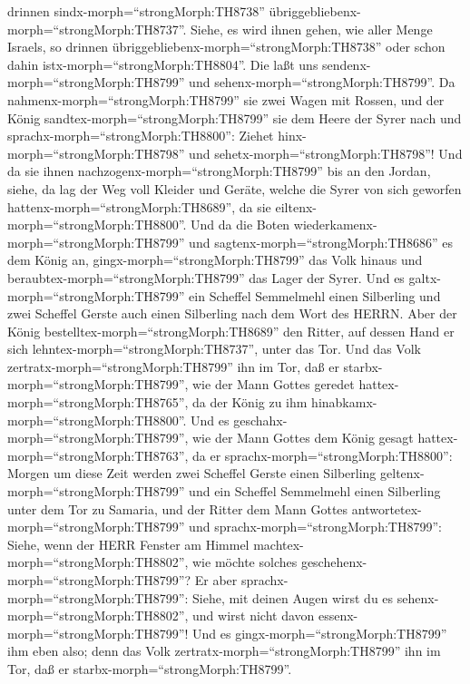 drinnen sindx-morph=``strongMorph:TH8738''
übriggebliebenx-morph=``strongMorph:TH8737''. Siehe, es wird ihnen
gehen, wie aller Menge Israels, so drinnen
übriggebliebenx-morph=``strongMorph:TH8738'' oder schon dahin
istx-morph=``strongMorph:TH8804''. Die laßt uns
sendenx-morph=``strongMorph:TH8799'' und
sehenx-morph=``strongMorph:TH8799''.  Da
nahmenx-morph=``strongMorph:TH8799'' sie zwei Wagen mit Rossen, und der
König sandtex-morph=``strongMorph:TH8799'' sie dem Heere der Syrer nach
und sprachx-morph=``strongMorph:TH8800'': Ziehet
hinx-morph=``strongMorph:TH8798'' und
sehetx-morph=``strongMorph:TH8798''!  Und da sie ihnen
nachzogenx-morph=``strongMorph:TH8799'' bis an den Jordan, siehe, da lag
der Weg voll Kleider und Geräte, welche die Syrer von sich geworfen
hattenx-morph=``strongMorph:TH8689'', da sie
eiltenx-morph=``strongMorph:TH8800''. Und da die Boten
wiederkamenx-morph=``strongMorph:TH8799'' und
sagtenx-morph=``strongMorph:TH8686'' es dem König an, 
gingx-morph=``strongMorph:TH8799'' das Volk hinaus und
beraubtex-morph=``strongMorph:TH8799'' das Lager der Syrer. Und es
galtx-morph=``strongMorph:TH8799'' ein Scheffel Semmelmehl einen
Silberling und zwei Scheffel Gerste auch einen Silberling nach dem Wort
des HERRN.  Aber der König
bestelltex-morph=``strongMorph:TH8689'' den Ritter, auf dessen Hand er
sich lehntex-morph=``strongMorph:TH8737'', unter das Tor. Und das Volk
zertratx-morph=``strongMorph:TH8799'' ihn im Tor, daß er
starbx-morph=``strongMorph:TH8799'', wie der Mann Gottes geredet
hattex-morph=``strongMorph:TH8765'', da der König zu ihm
hinabkamx-morph=``strongMorph:TH8800''.  Und es
geschahx-morph=``strongMorph:TH8799'', wie der Mann Gottes dem König
gesagt hattex-morph=``strongMorph:TH8763'', da er
sprachx-morph=``strongMorph:TH8800'': Morgen um diese Zeit werden zwei
Scheffel Gerste einen Silberling geltenx-morph=``strongMorph:TH8799''
und ein Scheffel Semmelmehl einen Silberling unter dem Tor zu Samaria,
 und der Ritter dem Mann Gottes
antwortetex-morph=``strongMorph:TH8799'' und
sprachx-morph=``strongMorph:TH8799'': Siehe, wenn der HERR Fenster am
Himmel machtex-morph=``strongMorph:TH8802'', wie möchte solches
geschehenx-morph=``strongMorph:TH8799''? Er aber
sprachx-morph=``strongMorph:TH8799'': Siehe, mit deinen Augen wirst du
es sehenx-morph=``strongMorph:TH8802'', und wirst nicht davon
essenx-morph=``strongMorph:TH8799''!  Und es
gingx-morph=``strongMorph:TH8799'' ihm eben also; denn das Volk
zertratx-morph=``strongMorph:TH8799'' ihn im Tor, daß er
starbx-morph=``strongMorph:TH8799''.

